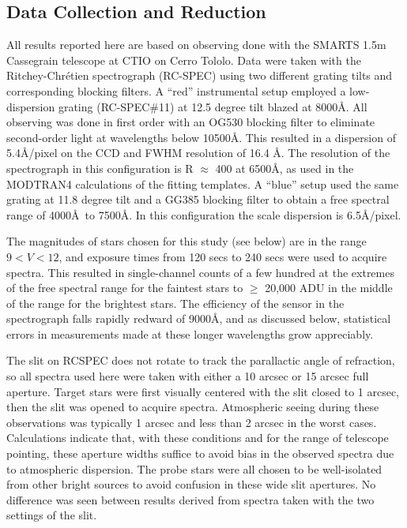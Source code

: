 \documentclass[manuscript]{aastex}
\begin{document}
\subsection{Data Collection and Reduction}

All results reported here are based on observing done with the SMARTS 1.5m Cassegrain telescope at CTIO on Cerro Tololo.
Data were taken with the Ritchey-Chr\'etien spectrograph (RC-SPEC) using two different grating tilts and corresponding blocking filters.
A ``red'' instrumental setup employed a low-dispersion grating (RC-SPEC\#11) at 12.5 degree tilt blazed at 8000\AA.
All observing was done in first order with an OG530 blocking filter to eliminate second-order light at wavelengths below 10500\AA.
This resulted in a dispersion of 5.4\AA/pixel on the CCD and FWHM resolution of 16.4 \AA.
The resolution of the spectrograph in this configuration is R $\approx$ 400 at 6500\AA, as used in the MODTRAN4 calculations of the fitting templates.
A ``blue'' setup used the same grating at 11.8 degree tilt and a GG385 blocking filter to obtain a free spectral range of 4000\AA~to 7500\AA.
In this configuration the scale dispersion is 6.5\AA/pixel. 

The magnitudes of stars chosen for this study (see below) are in the range $9 < V < 12$,
and exposure times from 120 secs to 240 secs were used to acquire spectra.  
This resulted in single-channel counts of a few hundred at the extremes of the free spectral range for the faintest stars
to $\ge$ 20,000 ADU in the middle of the range for the brightest stars.
The efficiency of the sensor in the spectrograph falls rapidly redward of 9000\AA, and as discussed below, statistical errors in
measurements made at these longer wavelengths grow appreciably.  

The slit on RCSPEC does not rotate to track the parallactic angle of refraction,
so all spectra used here were taken with either a 10 arcsec or 15 arcsec full aperture.
Target stars were first visually centered with the slit closed to 1 arcsec, then the slit was opened to acquire spectra.
Atmospheric seeing during these observations was typically 1 arcsec and less than 2 arcsec in the worst cases.
Calculations \cite{filippenko} indicate that, with these conditions and for the range of telescope pointing,
these aperture widths suffice to avoid bias in the observed spectra due to atmospheric dispersion.
The probe stars were all chosen to be well-isolated from other bright sources to avoid confusion in these wide slit apertures.
No difference was seen between results derived from spectra taken with the two settings of the slit.
\end{document}

